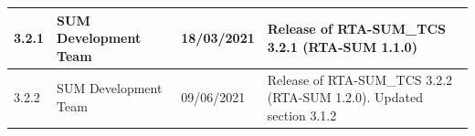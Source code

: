 \begin{longtable}{|l|l|l|l|}
\begin{minipage}{0.14\linewidth}\raggedright\vspace{.75ex}3.2.1\vspace{.75ex}\end{minipage} & \begin{minipage}{0.19\linewidth}\raggedright\vspace{.75ex}SUM Development Team\vspace{.75ex}\end{minipage} & \begin{minipage}{0.12\linewidth}\raggedright\vspace{.75ex}18/03/2021\vspace{.75ex}\end{minipage} & \begin{minipage}{0.43\linewidth}\raggedright\vspace{.75ex}Release of RTA-SUM_TCS 3.2.1 (RTA-SUM 1.1.0)\vspace{.75ex}\end{minipage}\\\hline
\begin{minipage}{0.14\linewidth}\raggedright\vspace{.75ex}3.2.2\vspace{.75ex}\end{minipage} & \begin{minipage}{0.19\linewidth}\raggedright\vspace{.75ex}SUM Development Team\vspace{.75ex}\end{minipage} & \begin{minipage}{0.12\linewidth}\raggedright\vspace{.75ex}09/06/2021\vspace{.75ex}\end{minipage} & \begin{minipage}{0.43\linewidth}\raggedright\vspace{.75ex}Release of RTA-SUM_TCS 3.2.2 (RTA-SUM 1.2.0). Updated section 3.1.2\vspace{.75ex}\end{minipage}\\\hline

\end{longtable}
